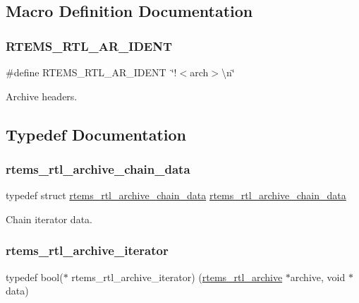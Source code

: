 \subsection{Macro Definition Documentation}
\mbox{\label{rtl-archive_8c_a5ef2fee55deb8475bec01267e205ca2b}} 
\subsubsection{\texorpdfstring{RTEMS\_RTL\_AR\_IDENT}{RTEMS\_RTL\_AR\_IDENT}}
{\footnotesize\ttfamily \#define R\+T\+E\+M\+S\+\_\+\+R\+T\+L\+\_\+\+A\+R\+\_\+\+I\+D\+E\+NT~\char`\"{}!$<$arch$>$\textbackslash{}n\char`\"{}}

Archive headers. 

\subsection{Typedef Documentation}
\mbox{\label{rtl-archive_8c_a8104f59b72abc78fe651d276082bfcfd}} 
\subsubsection{\texorpdfstring{rtems\_rtl\_archive\_chain\_data}{rtems\_rtl\_archive\_chain\_data}}
{\footnotesize\ttfamily typedef struct \mbox{\hyperlink{structrtems__rtl__archive__chain__data}{rtems\+\_\+rtl\+\_\+archive\+\_\+chain\+\_\+data}}  \mbox{\hyperlink{structrtems__rtl__archive__chain__data}{rtems\+\_\+rtl\+\_\+archive\+\_\+chain\+\_\+data}}}

Chain iterator data. \mbox{\label{rtl-archive_8c_a7f654505aadef94dfaca10b5cce047e4}} 
\subsubsection{\texorpdfstring{rtems\_rtl\_archive\_iterator}{rtems\_rtl\_archive\_iterator}}
{\footnotesize\ttfamily typedef bool($\ast$ rtems\+\_\+rtl\+\_\+archive\+\_\+iterator) (\mbox{\hyperlink{structrtems__rtl__archive}{rtems\+\_\+rtl\+\_\+archive}} $\ast$archive, void $\ast$data)}

